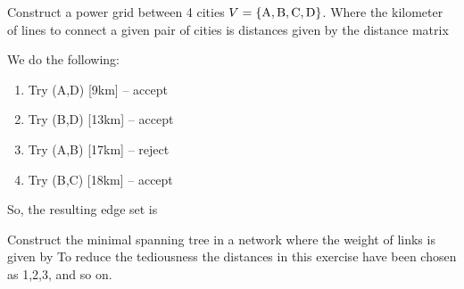 
Construct a power grid between 4 cities $V=\{ {\rm A},{\rm B},{\rm C},{\rm D}\}$. Where the kilometer of lines to connect a given pair of cities is distances given by the distance matrix
  

\solution
We do the following:
\begin{enumerate}
\item Try (A,D) [9km] -- accept
\item Try (B,D) [13km] -- accept
\item Try (A,B) [17km] -- reject
\item Try (B,C) [18km] -- accept  
\end{enumerate}
So, the resulting edge set is 



Construct the minimal spanning tree in a network where the weight of links is given by
To reduce the tediousness the distances in this exercise have been chosen as 1,2,3, and so on. 


